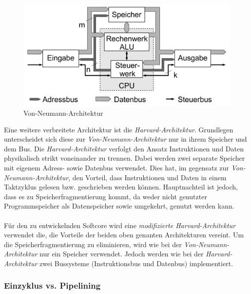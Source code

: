             \begin{figure}[H]
                \centering
                \includegraphics[scale=0.2]{img/vonneumann.png}
                \caption[Von-Neumann-Architektur]{Von-Neumann-Architektur \cite{von-neumann-architektur}}
                \label{fig:vonneumann}
            \end{figure}

            Eine weitere verbreitete Architektur ist die \textit{Harvard-Architektur}.
            Grundlegen unterscheidet sich diese zur \textit{Von-Neumann-Architektur}
            nur in ihrem Speicher und dem Bus. Die \textit{Harvard-Architektur} verfolgt den Ansatz
            Instruktionen und Daten physikalisch strikt voneinander zu trennen.
            Dabei werden zwei separate Speicher mit eigenem Adress- sowie Datenbus verwendet.
            Dies hat, im gegensatz zur \textit{Von-Neumann-Architektur}, den Vorteil, dass Instruktionen
            und Daten in einem Taktzyklus gelesen bzw. geschrieben werden können. Hauptnachteil ist jedoch,
            dass es zu Speicherfragmentierung kommt, da weder nicht genutzter Programmspeicher als Datenspeicher
            sowie umgekehrt, genutzt werden kann.
            \\\\
            Für den zu entwickelnden Softcore wird eine \textit{modifizierte Harvard-Architektur} verwendet die,
            die Vorteile der beiden oben genanten Architekturen vereint. Um die Speicherfragmentierung zu eliminieren, 
            wird wie bei der \textit{Von-Neumann-Architektur} nur ein Speicher verwendet.
            Jedoch werden wie bei der \textit{Harvard-Architektur} zwei Bussysteme (Instruktionsbus und Datenbus)
            implementiert. 

        \subsubsection{Einzyklus vs. Pipelining}

